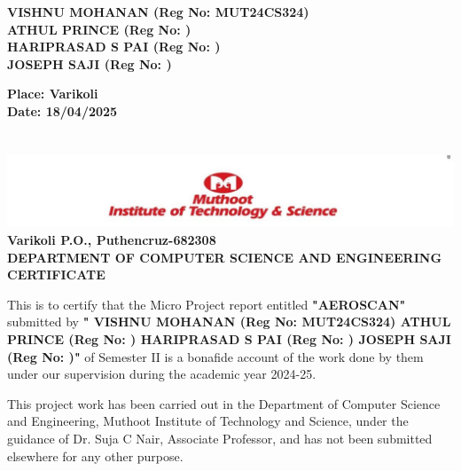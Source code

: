 \documentclass[a4paper,12pt]{report}
\begin{document}
\vfill

\begin{flushright} 
  \textbf{VISHNU MOHANAN (Reg No: MUT24CS324)}\\
  \textbf{ATHUL PRINCE (Reg No: )}\\
  \textbf{HARIPRASAD S PAI (Reg No: )}\\
  \textbf{JOSEPH SAJI (Reg No: )}
\end{flushright}

\vfill

\textbf{Place: Varikoli}\\
\textbf{Date: 18/04/2025}

\newpage

\chapter*{}
\begin{center}
    
    \includegraphics[width=1.0\textwidth]{muthoot_logo.jpg} \\[1.0cm]
    
    \textbf{Varikoli P.O., Puthencruz-682308} \\[0.5cm]
    \textbf{DEPARTMENT OF COMPUTER SCIENCE AND ENGINEERING} \\[1cm]
    \textbf{}
    \textbf{}
    \textbf{\textbf{\bfseries CERTIFICATE}} \\[1cm]
\end{center}


This is to certify that the Micro Project report entitled \textbf{ "AEROSCAN"} submitted by \textbf{"  \textbf{VISHNU MOHANAN (Reg No: MUT24CS324)}
\textbf{ATHUL PRINCE (Reg No: )}
\textbf{HARIPRASAD S PAI (Reg No: )}
\textbf{JOSEPH SAJI (Reg No: )}"} of Semester II is a bonafide account of the work done by them under our supervision during the academic year 2024-25.

This project work has been carried out in the Department of Computer Science and Engineering, Muthoot Institute of Technology and Science, under the guidance of Dr. Suja C Nair, Associate Professor, and has not been submitted elsewhere for any other purpose.

\vfill
\end{document}
